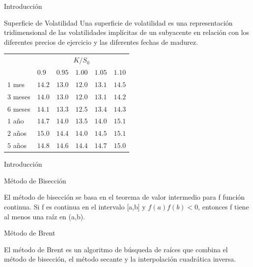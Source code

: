 \documentclass{beamer}
\begin{document}
\begin{frame}{Introducci\'on}

  \begin{block}{Superficie de Volatilidad}
    Una superficie de volatilidad es una representaci\'on tridimensional de las volatilidades
    impl\'icitas de un subyacente en relaci\'on con los diferentes precios de ejercicio y las
    diferentes fechas de madurez.
  \end{block}

  \begin{table}[]
    \centering
    \begin{tabular}{l|lllll}
                 & \multicolumn{5}{c}{$K/S_0$} \\ \cline{2-6}

                          & $0.9$  & $0.95$ & $1.00$ & $1.05$ & $1.10$ \\ \cline{2-6}
                $1$ mes   & $14.2$ & $13.0$ & $12.0$ & $13.1$ & $14.5$ \\ 
                $3$ meses & $14.0$ & $13.0$ & $12.0$ & $13.1$ & $14.2$ \\ 
                $6$ meses & $14.1$ & $13.3$ & $12.5$ & $13.4$ & $14.3$ \\ 
                $1$ a\~no   & $14.7$ & $14.0$ & $13.5$ & $14.0$ & $15.1$ \\ 
                $2$ a\~nos  & $15.0$ & $14.4$ & $14.0$ & $14.5$ & $15.1$ \\ 
                $5$ a\~nos  & $14.8$ & $14.6$ & $14.4$ & $14.7$ & $15.0$ \\ 
    \end{tabular}
  \end{table}

\end{frame}


\begin{frame}{Introducci\'on}

    \begin{block}{M\'etodo de Bisecci\'on}

    El m\'etodo de bisecci\'on se basa en el teorema de valor intermedio para f
    funci\'on continua. Si f es continua en el intervalo [a,b] y $f(a)f(b)< 0$, entonces
    f tiene al menos una ra\'iz en (a,b).

    \end{block}

    \begin{block}{M\'etodo de Brent}

    El m\'etodo de Brent es un algoritmo de b\'usqueda de ra\'ices que combina el
    m\'etodo de bisecci\'on, el m\'etodo secante y la interpolaci\'on cuadr\'atica inversa.

    \end{block}

\end{frame}
\end{document}
